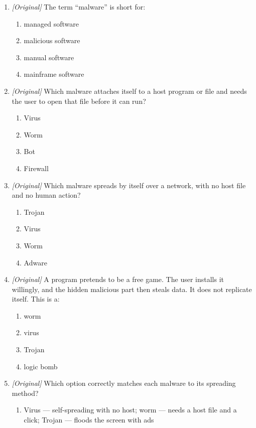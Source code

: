 \begin{enumerate}[label=\textbf{Q\arabic*.}, leftmargin=*]
\item \textit{[Original]} The term ``malware'' is short for:
  \begin{enumerate}[label=\Alph*.]
    \item managed software
    \item malicious software
    \item manual software
    \item mainframe software
  \end{enumerate}
\item \textit{[Original]} Which malware attaches itself to a host program or
  file and needs the user to open that file before it can run?
  \begin{enumerate}[label=\Alph*.]
    \item Virus
    \item Worm
    \item Bot
    \item Firewall
  \end{enumerate}
\item \textit{[Original]} Which malware spreads by itself over a network,
  with no host file and no human action?
  \begin{enumerate}[label=\Alph*.]
    \item Trojan
    \item Virus
    \item Worm
    \item Adware
  \end{enumerate}
\item \textit{[Original]} A program pretends to be a free game. The user
  installs it willingly, and the hidden malicious part then steals data. It
  does not replicate itself. This is a:
  \begin{enumerate}[label=\Alph*.]
    \item worm
    \item virus
    \item Trojan
    \item logic bomb
  \end{enumerate}
\item \textit{[Original]} Which option correctly matches each malware to its
  spreading method?
  \begin{enumerate}[label=\Alph*.]
    \item Virus --- self-spreading with no host; worm --- needs a host file
      and a click; Trojan --- floods the screen with ads

\end{enumerate}
\end{enumerate}
